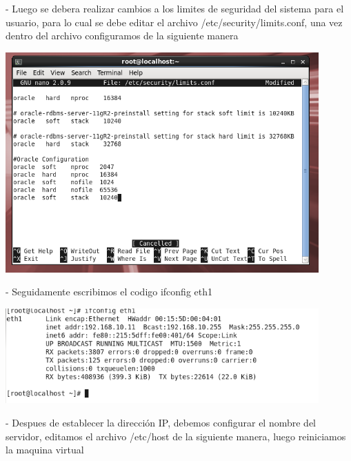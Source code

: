 \documentclass[12pt,letterpaper]{article}
\begin{document}
\begin{itemize}
- Luego se debera realizar cambios a los limites de seguridad del sistema para el usuario, para lo
cual se debe editar el archivo /etc/security/limits.conf, una vez dentro del archivo configuramos de la siguiente manera\\
\end{itemize}

\begin{center}
	\includegraphics[width=12cm]{./Imagenes/21} 
\end{center}


\begin{itemize}
- Seguidamente escribimos el codigo ifconfig eth1\\
\end{itemize}

\begin{center}
	\includegraphics[width=12cm]{./Imagenes/22} 
\end{center}


\begin{itemize}
- Despues de establecer la dirección IP, debemos configurar el nombre del servidor, editamos el archivo /etc/host de la siguiente manera, luego reiniciamos la maquina virtual\\
\end{itemize}
\end{document}

